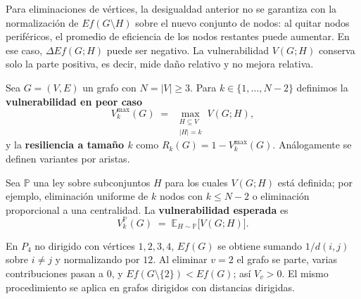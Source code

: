             \begin{observacion}
                Para eliminaciones de vértices, la desigualdad anterior no se garantiza con la normalización de $Ef(G\setminus H)$ sobre el nuevo conjunto de nodos: al quitar nodos periféricos, el promedio de eficiencia de los nodos restantes puede aumentar. En ese caso, $\Delta Ef(G;H)$ puede ser negativo. La vulnerabilidad $V(G;H)$ conserva solo la parte positiva, es decir, mide daño relativo y no mejora relativa.
            \end{observacion}

            \begin{definicion}
                Sea $G=(V,E)$ un grafo con $N=|V|\ge 3$. Para $k\in\{1,\dots,N-2\}$ definimos la \textbf{vulnerabilidad en peor caso}
                \[
                V_k^{\max}(G)\;=\;\max_{\substack{H\subseteq V\\ |H|=k}} V(G;H),
                \]
                y la \textbf{resiliencia a tamaño $k$} como $R_k(G)=1-V_k^{\max}(G)$. Análogamente se definen variantes por aristas.
            \end{definicion}

            \begin{definicion}
                Sea $\mathbb{P}$ una ley sobre subconjuntos $H$ para los cuales $V(G;H)$ está definida; por ejemplo, eliminación uniforme de $k$ nodos con $k\le N-2$ o eliminación proporcional a una centralidad. La \textbf{vulnerabilidad esperada} es
                \[
                V_k^{\mathbb{P}}(G)\;=\;\mathbb{E}_{H\sim\mathbb{P}}\!\big[V(G;H)\big].
                \]
            \end{definicion}

            \begin{ejemplo}
                En $P_4$ no dirigido con vértices $1,2,3,4$, $Ef(G)$ se obtiene sumando $1/d(i,j)$ sobre $i\neq j$ y normalizando por $12$. Al eliminar $v=2$ el grafo se parte, varias contribuciones pasan a $0$, y $Ef(G\setminus\{2\})<Ef(G)$; así $V_v>0$. El mismo procedimiento se aplica en grafos dirigidos con distancias dirigidas.
            \end{ejemplo}

